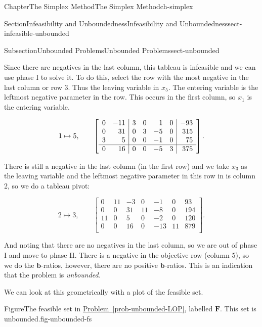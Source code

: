 \documentclass[oneside,10pt,]{book}
\newcommand{\xreffont}{\relax}
\numberwithin{equation}{section}
\newcommand{\amp}{&}
\begin{document}
\begin{chapterptx}{Chapter}{The Simplex Method}{}{The Simplex Method}{}{}{ch-simplex}
\begin{sectionptx}{Section}{Infeasibility and Unboundedness}{}{Infeasibility and Unboundedness}{}{}{sect-infeasible-unbounded}
\begin{subsectionptx}{Subsection}{Unbounded Problems}{}{Unbounded Problems}{}{}{sect-unbounded}
\begin{equation*}
\end{equation*}
%
\par
Since there are negatives in the last column, this tableau is infeasible and we can use phase I to solve it. To do this, select the row with the most negative in the last column or row 3.  Thus the leaving variable in \(x_5\). The entering variable is the leftmost negative parameter in the row. This occurs in the first column, so \(x_1\) is the entering variable.%
\par
%
\begin{equation*}
1 \mapsto 5, \qquad \left[\begin{array}{rr|rrrr|r} 0 \amp -11 \amp 3 \amp 0 \amp 1 \amp 0 \amp -93\\ 0 \amp 31 \amp 0 \amp 3 \amp -5 \amp 0 \amp 315\\ 3 \amp 5 \amp 0 \amp 0 \amp -1 \amp 0 \amp 75\\ \hline 0 \amp 16 \amp 0 \amp 0 \amp -5 \amp 3 \amp 375\\ \end{array} \right].\\
\end{equation*}
%
\par
There is still a negative in the last column (in the first row) and we take \(x_3\) as the leaving variable and the leftmost negative parameter in this row in is column 2, so we do a tableau pivot:%
\par
%
\begin{equation*}
2 \mapsto 3, \qquad \left[\begin{array}{rr|rrrr|r} 0 \amp 11 \amp -3 \amp 0 \amp -1 \amp 0 \amp 93\\ 0 \amp 0 \amp 31 \amp 11 \amp -8 \amp 0 \amp 194\\ 11 \amp 0 \amp 5 \amp 0 \amp -2 \amp 0 \amp 120\\ \hline 0 \amp 0 \amp 16 \amp 0 \amp -13 \amp 11 \amp 879\\ \end{array} \right].
\end{equation*}
%
\par
And noting that there are no negatives in the last column, so we are out of phase I and move to phase II. There is a negative in the objective row (column 5), so we do the \(\boldsymbol{b}\)-ratios, however, there are no positive \(\boldsymbol{b}\)-ratios. This is an indication that the problem is \emph{unbounded.}%
\par
We can look at this geometrically with a plot of the feasible set.%
\begin{figureptx}{Figure}{The feasible set in \hyperref[prob-unbounded-LOP]{Problem~{\xreffont\ref{prob-unbounded-LOP}}}, labelled \(\boldsymbol{F}\). This set is unbounded.}{fig-unbounded-fs}{}%

\end{figureptx}
\end{subsectionptx}
\end{sectionptx}
\end{chapterptx}
\end{document}
